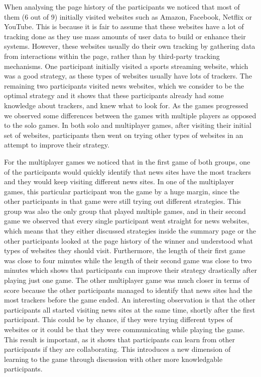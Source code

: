 \documentclass{l4proj}
\begin{document}
When analysing the page history of the participants we noticed that most of them (6 out of 9) initially visited websites such as Amazon, Facebook, Netflix or YouTube. This is because it is fair to assume that these websites have a lot of tracking done as they use mass amounts of user data to build or enhance their systems. However, these websites usually do their own tracking by gathering data from interactions within the page, rather than by third-party tracking mechanisms. One participant initially visited a sports streaming website, which was a good strategy, as these types of websites usually have lots of trackers. The remaining two participants visited news websites, which we consider to be the optimal strategy and it shows that these participants already had some knowledge about trackers, and knew what to look for.
As the games progressed we observed some differences between the games with multiple players as opposed to the solo games. In both solo and multiplayer games, after visiting their initial set of websites, participants then went on trying other types of websites in an attempt to improve their strategy. 

For the multiplayer games we noticed that in the first game of both groups, one of the participants would quickly identify that news sites have the most trackers and they would keep visiting different news sites. 
In one of the multiplayer games, this particular participant won the game by a huge margin, since the other participants in that game were still trying out different strategies. This group was also the only group that played multiple games, and in their second game we observed that every single participant went straight for news websites, which means that they either discussed strategies inside the summary page or the other participants looked at the page history of the winner and understood what types of websites they should visit. Furthermore, the length of their first game was close to four minutes while the length of their second game was close to two minutes which shows that participants can improve their strategy drastically after playing just one game. The other multiplayer game was much closer in terms of score because the other participants managed to identify that news sites had the most trackers before the game ended. An interesting observation is that the other participants all started visiting news sites at the same time, shortly after the first participant. This could be by chance, if they were trying different types of websites or it could be that they were communicating while playing the game. This result is important, as it shows that participants can learn from other participants if they are collaborating. This introduces a new dimension of learning to the game through discussion with other more knowledgable participants.
\end{document}
